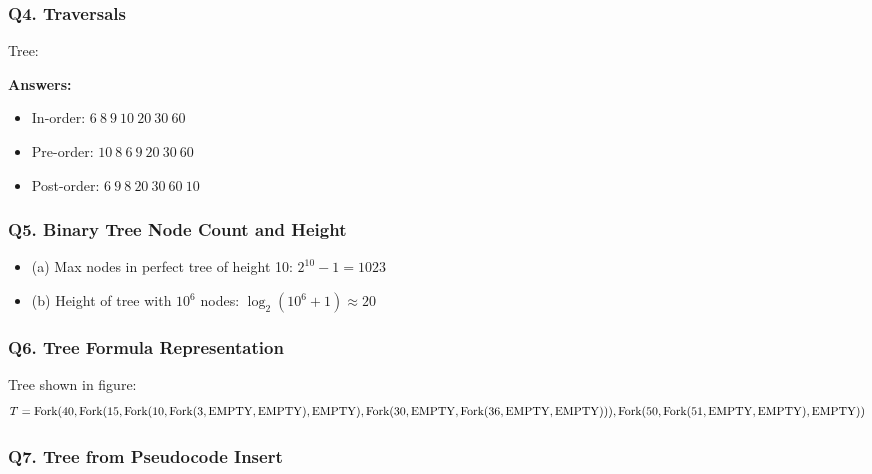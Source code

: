 \subsubsection{Q4. Traversals}
Tree: \\

\textbf{Answers:}
\begin{itemize}
  \item In-order: $6\ 8\ 9\ 10\ 20\ 30\ 60$
  \item Pre-order: $10\ 8\ 6\ 9\ 20\ 30\ 60$
  \item Post-order: $6\ 9\ 8\ 20\ 30\ 60\ 10$
\end{itemize}

\subsubsection{Q5. Binary Tree Node Count and Height}

\begin{itemize}
  \item (a) Max nodes in perfect tree of height 10: $2^{10} - 1 = 1023$
  \item (b) Height of tree with $10^6$ nodes: $\log_2(10^6 + 1) \approx 20$
\end{itemize}

\subsubsection{Q6. Tree Formula Representation}

Tree shown in figure:
\[
T = \text{Fork}(40, \text{Fork}(15, \text{Fork}(10, \text{Fork}(3, \text{EMPTY}, \text{EMPTY}), \text{EMPTY}),\\ 
\text{Fork}(30, \text{EMPTY}, \text{Fork}(36, \text{EMPTY}, \text{EMPTY}))),\\
\text{Fork}(50, \text{Fork}(51, \text{EMPTY}, \text{EMPTY}), \text{EMPTY}))
\]

\subsubsection{Q7. Tree from Pseudocode Insert}

